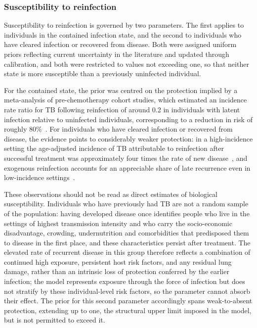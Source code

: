 \subsubsection{Susceptibility to reinfection}

Susceptibility to reinfection is governed by two parameters. The first applies to individuals in the contained infection state, and the second to individuals who have cleared infection or recovered from disease. Both were assigned uniform priors reflecting current uncertainty in the literature and updated through calibration, and both were restricted to values not exceeding one, so that neither state is more susceptible than a previously uninfected individual.

For the contained state, the prior was centred on the protection implied by a meta-analysis of pre-chemotherapy cohort studies, which estimated an incidence rate ratio for TB following reinfection of around 0.2 in individuals with latent infection relative to uninfected individuals, corresponding to a reduction in risk of roughly 80\%~\cite{andrews2012}. For individuals who have cleared infection or recovered from disease, the evidence points to considerably weaker protection: in a high-incidence setting the age-adjusted incidence of TB attributable to reinfection after successful treatment was approximately four times the rate of new disease~\cite{verver2005}, and exogenous reinfection accounts for an appreciable share of late recurrence even in low-incidence settings~\cite{interrante2015}.

These observations should not be read as direct estimates of biological susceptibility. Individuals who have previously had TB are not a random sample of the population: having developed disease once identifies people who live in the settings of highest transmission intensity and who carry the socio-economic disadvantage, crowding, undernutrition and comorbidities that predisposed them to disease in the first place, and these characteristics persist after treatment. The elevated rate of recurrent disease in this group therefore reflects a combination of continued high exposure, persistent host risk factors, and any residual lung damage, rather than an intrinsic loss of protection conferred by the earlier infection; the model represents exposure through the force of infection but does not stratify by these individual-level risk factors, so the parameter cannot absorb their effect. The prior for this second parameter accordingly spans weak-to-absent protection, extending up to one, the structural upper limit imposed in the model, but is not permitted to exceed it.

